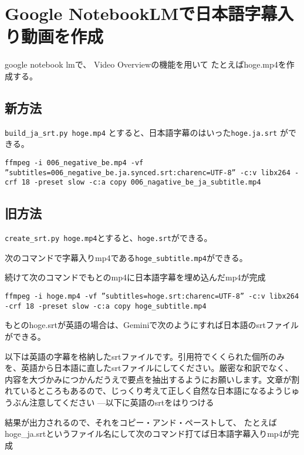 \documentclass[12pt,jafontscale=0.9247]{jlreq}
\begin{document}
\newpage
\section*{Google NotebookLMで日本語字幕入り動画を作成}


google notebook lmで、
Video Overviewの機能を用いて
たとえばhoge.mp4を作成する。

\subsection*{新方法}

\verb|build_ja_srt.py hoge.mp4| とすると、日本語字幕のはいった\verb|hoge.ja.srt| ができる。

\begin{verbatim}
ffmpeg -i 006_negative_be.mp4 -vf ”subtitles=006_negative_be.ja.synced.srt:charenc=UTF-8” -c:v libx264 -crf 18 -preset slow -c:a copy 006_nagative_be_ja_subtitle.mp4
\end{verbatim}


\subsection*{旧方法}
\verb|create_srt.py hoge.mp4|とすると、\verb|hoge.srt|ができる。

次のコマンドで字幕入りmp4である\verb|hoge_subtitle.mp4|ができる。

続けて次のコマンドでもとのmp4に日本語字幕を埋め込んだmp4が完成


\begin{verbatim}
ffmpeg -i hoge.mp4 -vf ”subtitles=hoge.srt:charenc=UTF-8” -c:v libx264 -crf 18 -preset slow -c:a copy hoge_subtitle.mp4
\end{verbatim}

\bigskip

もとのhoge.srtが英語の場合は、Geminiで次のようにすれば日本語のsrtファイルができる。
\begin{tcolorbox}
 以下は英語の字幕を格納したsrtファイルです。引用符でくくられた個所のみを、英語から日本語に直したsrtファイルにしてください。厳密な和訳でなく、内容を大づかみにつかんだうえで要点を抽出するようにお願いします。文章が割れているところもあるので、じっくり考えて正しく自然な日本語になるようじゅうぶん注意してください
---以下に英語のsrtをはりつける
\end{tcolorbox}

結果が出力されるので、それをコピー・アンド・ペーストして、
たとえばhoge\_ja.srtというファイル名にして次のコマンド打てば日本語字幕入りmp4が完成
\end{document}
